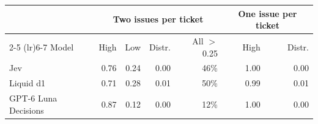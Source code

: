 \begin{tabular}{lrrrrrr}
\toprule
 & \multicolumn{4}{c}{Two issues per ticket} & \multicolumn{2}{c}{One issue per ticket} \\
\cmidrule(lr){2-5} \cmidrule(lr){6-7}
Model & High & Low & Distr. & All $>$0.25 & High & Distr. \\
\midrule
Jev & 0.76 & 0.24 & 0.00 & 46\% & 1.00 & 0.00 \\
Liquid d1 & 0.71 & 0.28 & 0.01 & 50\% & 0.99 & 0.01 \\
GPT-6 Luna Decisions & 0.87 & 0.12 & 0.00 & 12\% & 1.00 & 0.00 \\
\bottomrule
\end{tabular}
